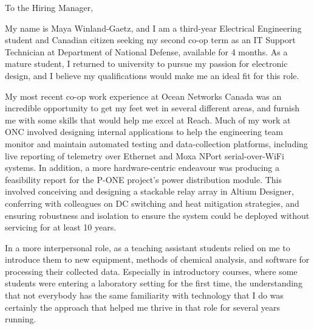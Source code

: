 \documentclass{letter}
\begin{document}
\begin{letter}{}
\opening{To the Hiring Manager,}

My name is Maya Winland-Gaetz, and I am a third-year Electrical Engineering student and Canadian citizen seeking my second co-op term as an IT Support Technician at Department of National Defense, available for 4 months. As a mature student, I returned to university to pursue my passion for electronic design, and I believe my qualifications would make me an ideal fit for this role.

% 
My most recent co-op work experience at Ocean Networks Canada was an incredible opportunity to get my feet wet in several different areas, and furnish me with some skills that would help me excel at Reach. 
Much of my work at ONC involved designing internal applications to help the engineering team monitor and maintain automated testing and data-collection platforms, including live reporting of telemetry over Ethernet and Moxa NPort serial-over-WiFi systems. 
In addition, a more hardware-centric endeavour was producing a feasibility report for the P-ONE project's power distribution module. This involved conceiving and designing a stackable relay array in Altium Designer, conferring with colleagues on DC switching and heat mitigation strategies, and ensuring robustness and isolation to ensure the system could be deployed without servicing for at least 10 years. 

In a more interpersonal role, as a teaching assistant students relied on me to introduce them to new equipment, methods of chemical analysis, and software for processing their collected data. Especially in introductory courses, where some students were entering a laboratory setting for the first time, the understanding that not everybody has the same familiarity with technology that I do was certainly the approach that helped me thrive in that role for several years running.


\end{letter}
\end{document}
